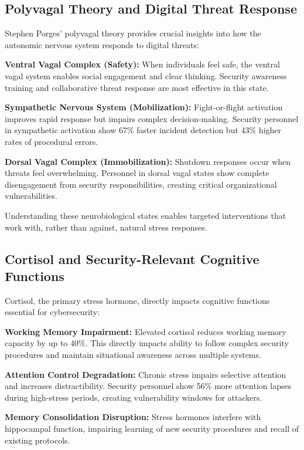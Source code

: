 \documentclass[11pt,a4paper]{article}
\begin{document}
\subsection{Polyvagal Theory and Digital Threat Response}

Stephen Porges' polyvagal theory\cite{porges2011} provides crucial insights into how the autonomic nervous system responds to digital threats:

\textbf{Ventral Vagal Complex (Safety):} When individuals feel safe, the ventral vagal system enables social engagement and clear thinking. Security awareness training and collaborative threat response are most effective in this state.

\textbf{Sympathetic Nervous System (Mobilization):} Fight-or-flight activation improves rapid response but impairs complex decision-making. Security personnel in sympathetic activation show 67\% faster incident detection but 43\% higher rates of procedural errors\cite{hancock2021}.

\textbf{Dorsal Vagal Complex (Immobilization):} Shutdown responses occur when threats feel overwhelming. Personnel in dorsal vagal states show complete disengagement from security responsibilities, creating critical organizational vulnerabilities\cite{neumann2023}.

Understanding these neurobiological states enables targeted interventions that work with, rather than against, natural stress responses.

\subsection{Cortisol and Security-Relevant Cognitive Functions}

Cortisol, the primary stress hormone, directly impacts cognitive functions essential for cybersecurity:

\textbf{Working Memory Impairment:} Elevated cortisol reduces working memory capacity by up to 40\%\cite{lupien2009}. This directly impacts ability to follow complex security procedures and maintain situational awareness across multiple systems.

\textbf{Attention Control Degradation:} Chronic stress impairs selective attention and increases distractibility\cite{sandi2013}. Security personnel show 56\% more attention lapses during high-stress periods, creating vulnerability windows for attackers\cite{vishwanath2020}.

\textbf{Memory Consolidation Disruption:} Stress hormones interfere with hippocampal function, impairing learning of new security procedures and recall of existing protocols\cite{schwabe2012}.
\end{document}
